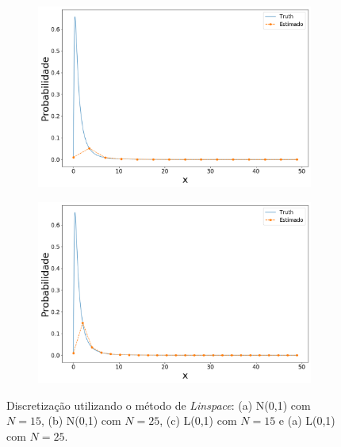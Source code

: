 \begin{figure}[H]
\begin{subfigure}[b]{0.45\textwidth}
		\caption{}
		\label{fig:lin_norm25}
	\end{subfigure}
	\\
	\begin{subfigure}[b]{0.45\textwidth}
		\centering 
		\includegraphics[width=\linewidth]{./figuras/Linspace_lognormal_15}
		\caption{}
		\label{fig:lin_log15}
	\end{subfigure}
	\hfill
	\begin{subfigure}[b]{0.45\textwidth}
		\centering 
		\includegraphics[width=\linewidth]{./figuras/Linspace_lognormal_25}
		\caption{}
		\label{fig:lin_log25}
	\end{subfigure}
	
	\caption{Discretização utilizando o método de \textit{Linspace}: (a) N(0,1) com $N = 15$, (b) N(0,1) com $N = 25$, (c) L(0,1) com $N = 15$ e (a) L(0,1) com $N = 25$.}
	\label{fig:normlin}
\end{figure}

